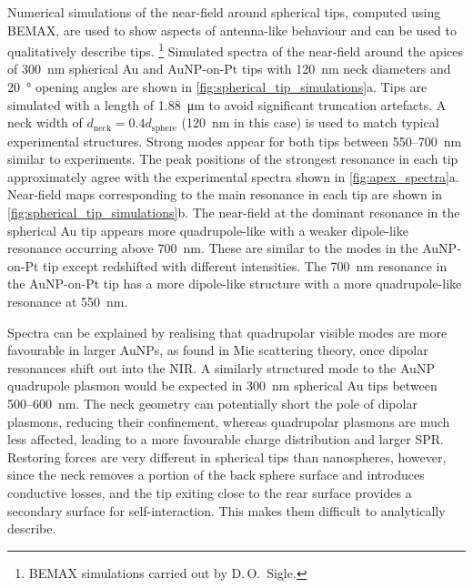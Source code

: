 \documentclass{article}
\begin{document}
Numerical simulations of the near-field around spherical tips, computed using BEMAX, are used to show aspects of antenna-like behaviour and can be used to qualitatively describe tips.%
\footnote{BEMAX simulations carried out by D.\,O.\ Sigle.}
Simulated spectra of the near-field around the apices of \SI{300}{nm} spherical Au and AuNP-on-Pt tips with \SI{120}{nm} neck diameters and \SI{20}{\degree} opening angles are shown in \autoref{fig:spherical_tip_simulations}a. Tips are simulated with a length of \SI{1.88}{\micro\metre} to avoid significant truncation artefacts. A neck width of $d_{\mathrm{neck}}=0.4d_{\mathrm{sphere}}$ (\SI{120}{nm} in this case) is used to match typical experimental structures. Strong modes appear for both tips between 550--\SI{700}{nm} similar to experiments. The peak positions of the strongest resonance in each tip approximately agree with the experimental spectra shown in \autoref{fig:apex_spectra}a. Near-field maps corresponding to the main resonance in each tip are shown in \autoref{fig:spherical_tip_simulations}b. The near-field at the dominant resonance in the spherical Au tip appears more quadrupole-like with a weaker dipole-like resonance occurring above \SI{700}{nm}. These are similar to the modes in the AuNP-on-Pt tip except redshifted with different intensities. The \SI{700}{nm} resonance in the AuNP-on-Pt tip has a more dipole-like structure with a more quadrupole-like resonance at \SI{550}{nm}.

Spectra can be explained by realising that quadrupolar visible modes are more favourable in larger AuNPs, as found in Mie scattering theory, once dipolar resonances shift out into the NIR. A similarly structured mode to the AuNP quadrupole plasmon would be expected in \SI{300}{nm} spherical Au tips between 500--\SI{600}{nm}. The neck geometry can potentially short the pole of dipolar plasmons, reducing their confinement, whereas quadrupolar plasmons are much less affected, leading to a more favourable charge distribution and larger SPR. Restoring forces are very different in spherical tips than nanospheres, however, since the neck removes a portion of the back sphere surface and introduces conductive losses, and the tip exiting close to the rear surface provides a secondary surface for self-interaction. This makes them difficult to analytically describe.
\end{document}
